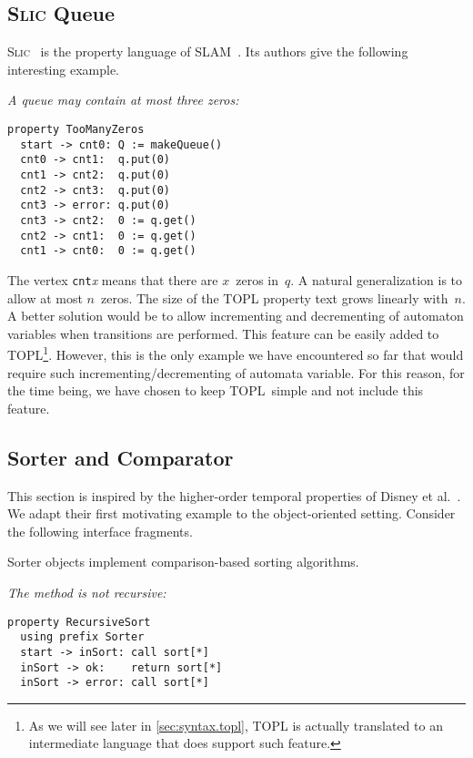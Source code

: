 \documentclass[preprint]{sigplanconf} %
\newcommand{\TPL}{TOPL}
\newcommand{\delimitVerbatim}{\par\nobreak\smallskip\noindent}
\theoremstyle{definition}
\theoremstyle{remark}
\begin{document}
\subsection{\textsc{Slic} Queue} %

\textsc{Slic}~\cite{ball2002} is the property language of SLAM~\cite{dblp:conf/cav/ballr01}.
Its authors give the following interesting example.

\medskip\emph{A queue may contain at most three zeros:}
\delimitVerbatim
\begin{Verbatim}
property TooManyZeros
  start -> cnt0: Q := makeQueue()
  cnt0 -> cnt1:  q.put(0)
  cnt1 -> cnt2:  q.put(0)
  cnt2 -> cnt3:  q.put(0)
  cnt3 -> error: q.put(0)
  cnt3 -> cnt2:  0 := q.get()
  cnt2 -> cnt1:  0 := q.get()
  cnt1 -> cnt0:  0 := q.get()
\end{Verbatim}
\delimitVerbatim
The vertex \texttt{cnt}\textit{x} means that there are $x$~zeros in~$q$.
A natural generalization is to allow at most $n$~zeros.
The size of the TOPL property text grows linearly with~$n$.
A better solution would be to allow incrementing and decrementing of automaton variables when transitions are performed.
This feature can be easily added to TOPL\footnote{ As we will see later in \autoref{sec:syntax.topl}, TOPL is actually translated to an intermediate language that does support such feature.}.
However, this is the only example we have encountered so far that would require such incrementing/decrementing of automata variable. For this reason, for the time being, we have chosen to keep \TPL \ simple and not include this feature.

\subsection{Sorter and Comparator}\label{sec:examples.sorter} %

This section is inspired by the higher-order temporal properties of Disney et al.~\cite{disney2011}.
We adapt their first motivating example to the object-oriented setting.
Consider the following interface fragments.
\delimitVerbatim

\delimitVerbatim
Sorter objects implement comparison-based sorting algorithms.

\medskip\emph{The \Verb@sort@ method is not recursive:}
\delimitVerbatim
\begin{Verbatim}
property RecursiveSort
  using prefix Sorter
  start -> inSort: call sort[*]
  inSort -> ok:    return sort[*]
  inSort -> error: call sort[*]
\end{Verbatim}
\end{document}
